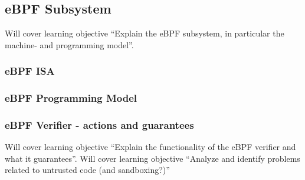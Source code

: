 
\subsection{eBPF Subsystem}
\label{subsec:ebpf_subsystem}
Will cover learning objective ``Explain the eBPF subsystem, in particular the machine- and programming model''.

\subsubsection{eBPF ISA}
\subsubsection{eBPF Programming Model}
\subsubsection{eBPF Verifier - actions and guarantees}
Will cover learning objective ``Explain the functionality of the eBPF verifier and what it guarantees''.
Will cover learning objective ``Analyze and identify problems related to untrusted code (and sandboxing?)''

  







